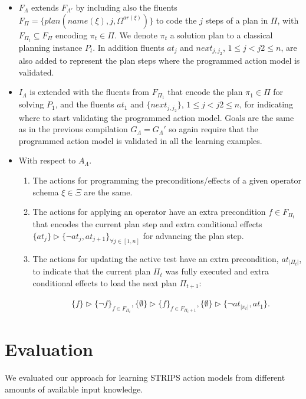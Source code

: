 \documentclass[letterpaper]{article} %
\begin{document}
\begin{itemize}
\item $F_{\Lambda}$ extends $F_{\Lambda'}$ by including also the fluents $F_{\Pi}=\{plan(name(\xi),j,\Omega^{ar(\xi)})\}$ to code the $j$ steps of a plan in $\Pi$, with $F_{\Pi_t}\subseteq F_{\Pi}$ encoding $\pi_t\in \Pi$. We denote $\pi_t$ a solution plan to a classical planning instance $P_t$. In addition fluents $at_j$ and $next_{j,j_2}$, {\small $1\leq j<j2\leq n$}, are also added to represent the plan steps where the programmed action model is validated.
\item $I_{\Lambda}$ is extended with the fluents from $F_{\Pi_1}$ that encode the plan $\pi_1\in \Pi$ for solving $P_1$, and the fluents $at_1$ and $\{next_{j,j_2}\}$, {\small $1\leq j<j2\leq n$}, for indicating where to start validating the programmed action model. Goals are the same as in the previous compilation $G_{\Lambda}=G_{\Lambda}'$ so again require that the programmed action model is validated in all  the learning examples.
\item With respect to $A_{\Lambda}$.
\begin{enumerate}
\item The actions for programming the preconditions/effects of a given operator schema $\xi\in\Xi$ are the same.
\item The actions for applying an operator have an extra precondition $f\in F_{\Pi_t}$ that encodes the current plan step and extra conditional effects $\{at_{j}\}\rhd\{\neg at_{j},at_{j+1}\}_{\forall j\in [1,n]}$ for advancing the plan step.
\item The actions for updating the active test have an extra precondition, $at_{|\Pi_t|}$, to indicate that the current plan $\Pi_t$ was fully executed and extra conditional effects to load the next plan $\Pi_{t+1}$:
\begin{small}
\begin{align*}
&\{f\}\rhd\{\neg f\}_{f\in F_{\Pi_t}}, \{\emptyset\}\rhd\{f\}_{f\in F_{\Pi_t+1}},\{\emptyset\}\rhd\{\neg at_{|\pi_t|},at_1\}.
\end{align*}
\end{small}
\end{enumerate}
\end{itemize}


\section{Evaluation}
We evaluated our approach for learning STRIPS action models from different amounts of available input knowledge.
\end{document}
